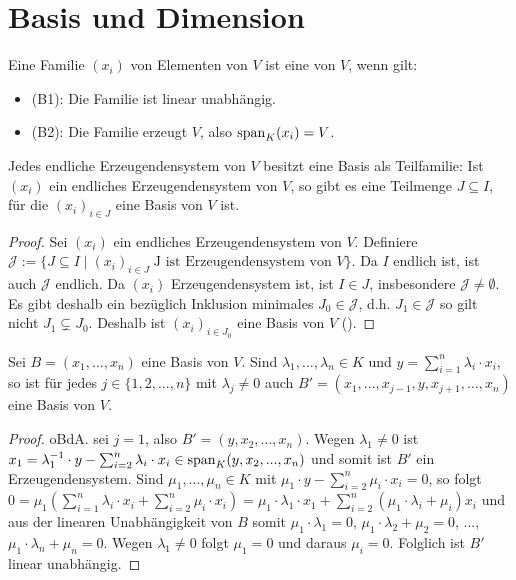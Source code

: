\section{Basis und Dimension}

\begin{definition}[Basis]
	Eine Familie $(x_i)$ von Elementen von $V$ ist eine  von $V$, wenn gilt:
	\begin{itemize}
		\item (B1): Die Familie ist linear unabhängig.
		\item (B2): Die Familie erzeugt $V$, also $\operatorname{span}_K(x_i) = V$.
	\end{itemize}
\end{definition}

\begin{theorem}[Basisauswahlsatz]
	Jedes endliche Erzeugendensystem von $V$ besitzt eine Basis  als 
	Teilfamilie: Ist $(x_i)$ ein endliches Erzeugendensystem von $V$, so gibt es eine Teilmenge $J\subseteq I$, 
	für die $(x_i)_{i\in J}$ eine Basis von $V$ ist. 
\end{theorem}
\begin{proof}
	Sei $(x_i)$ ein endliches Erzeugendensystem von $V$. Definiere $\mathcal J:=\{J \subseteq I \mid (x_i)_{i\in J}\; 
	\text{J ist Erzeugendensystem von }V\}$. Da $I$ endlich ist, ist auch $\mathcal J$ endlich. Da $(x_i)$ 
	Erzeugendensystem ist, ist $I\in J$, insbesondere $\mathcal J\neq\emptyset$. Es gibt deshalb ein bezüglich 
	Inklusion minimales $J_0\in \mathcal J$, d.h. $J_1 \in \mathcal J$ so gilt nicht $J_1 \subsetneq J_0$. Deshalb 
	ist $(x_i)_{i\in J_0}$ eine Basis von $V$ ().
\end{proof}

\begin{lemma}[Austauschlemma]
	Sei $B=(x_1,...,x_n)$  eine Basis von $V$. Sind $\lambda_1,...,\lambda_n \in K$ und 
	$y=\sum_{i=1}^n \lambda_i\cdot x_i$, so ist für jedes $j\in \{1,2,...,n\}$ mit $\lambda_j\neq 0$ auch 
	$B'=(x_1,...,x_{j-1},y,x_{j+1},...,x_n)$ eine Basis von $V$.
\end{lemma}
\begin{proof}
	oBdA. sei $j=1$, also $B'=(y,x_2,...,x_n)$. Wegen $\lambda_1\neq 0$ ist $x_1=\lambda_1^{-1}\cdot y - \sum
	_{i=2}^n \lambda_i\cdot x_i \in \operatorname{span}_K(y,x_2,...,x_n)$ und somit ist $B'$ ein Erzeugendensystem. Sind 
	$\mu_1,...,\mu_n \in K$ mit $\mu_1\cdot y - \sum_{i=2}^n \mu_i\cdot x_i=0$, so folgt $0=\mu_1(\sum
	_{i=1}^n \lambda_i\cdot x_i + \sum_{i=2}^n \mu_i\cdot x_i)=\mu_1\cdot \lambda_1\cdot x_1 + \sum
	_{i=2}^n (\mu_1\cdot \lambda_i + \mu_i)x_i$ und aus der linearen Unabhängigkeit von $B$ somit $\mu_1\cdot 
	\lambda_1=0$, $\mu_1\cdot \lambda_2 + \mu_2 =0$, ..., $\mu_1\cdot\lambda_n + \mu_n=0$. Wegen $\lambda_1\neq 0$ folgt 
	$\mu_1=0$ und daraus $\mu_i=0$. Folglich ist $B'$ linear unabhängig.
\end{proof}

